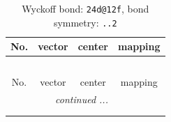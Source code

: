 \documentclass[fleqn,8pt]{jsarticle}
\begin{document}
\renewcommand{\arraystretch}{1.2}
\begin{longtable}{cccc}
\caption{Wyckoff bond: {\tt 24d@12f}, bond symmetry: {\tt ..2}}
 \\
 \hline \hline
No. & vector & center & mapping \\ \hline \endfirsthead

\multicolumn{3}{l}{\tablename\ \thetable{}} \\
 \hline \hline
No. & vector & center & mapping \\ \hline \endhead

 \hline \hline
\multicolumn{3}{r}{\footnotesize\it continued ...} \\ \endfoot

 \hline \hline
\multicolumn{3}{r}{} \\ \endlastfoot


\end{longtable}
\end{document}
